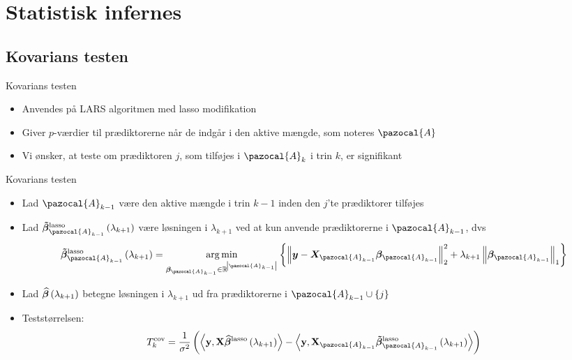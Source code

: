 \section{Statistisk infernes}
\subsection{Kovarians testen}
\begin{frame}{Kovarians testen}
\begin{itemize}
\item Anvendes på LARS algoritmen med lasso modifikation
\item Giver $p$-værdier til prædiktorerne når de indgår i den aktive mængde, som noteres $\pazocal{A}$
\item Vi ønsker, at teste om prædiktoren $j$, som tilføjes i $\pazocal{A}_k$ i trin $k$, er signifikant
\end{itemize}
\end{frame}

\begin{frame}{Kovarians testen}
\begin{itemize}
\item Lad $\pazocal{A}_{k-1}$ være den aktive mængde i trin $k-1$ inden den $j$'te prædiktorer tilføjes
\item  Lad $\boldsymbol{\tilde{\beta}}^{\text{lasso}}_{\pazocal{A}_{k-1}} \del{\lambda_{k+1}}$ være løsningen i $\lambda_{k+1}$ ved at kun anvende prædiktorerne i $\pazocal{A}_{k-1}$, dvs 
\begin{align*}
\boldsymbol{\tilde{\beta}}^{\text{lasso}}_{\pazocal{A}_{k-1}} \del{\lambda_{k+1}} = 
\underset{\boldsymbol{\beta}_{\pazocal{A}_{k-1}} \in \mathbb{R}^{\abs{\pazocal{A}_{k-1}}} }{\arg\min} \cbr{\left\Vert \vy - \vX_{\pazocal{A}_{k-1}} \boldsymbol\beta_{\pazocal{A}_{k-1}} \right\Vert^2_2 + \lambda_{k+1} \left\Vert \boldsymbol\beta_{\pazocal{A}_{k-1}}  \right\Vert_1}
\end{align*}
\item  Lad $\boldsymbol{\widehat{\beta}} \del{\lambda_{k+1}}$ betegne løsningen i $\lambda_{k+1}$ ud fra prædiktorerne i   $\pazocal{A}_{k-1} \cup \cbr{j}$
\item Teststørrelsen:
 \begin{align*}
T_k^{\text{cov}} = \frac{1}{\sigma^2}\del{ \left\langle \textbf{y}, \textbf{X} \widehat{\boldsymbol{\beta}}^\text{lasso} \del{\lambda_{k+1}} \right\rangle -  \left\langle  \textbf{y}, \textbf{X}_{\pazocal{A}_{k-1}} \boldsymbol{\tilde{\beta}}^\text{lasso}_{\pazocal{A}_{k-1}} \del{\lambda_{k+1}} \right\rangle}
\end{align*}
\end{itemize}
\end{frame}

